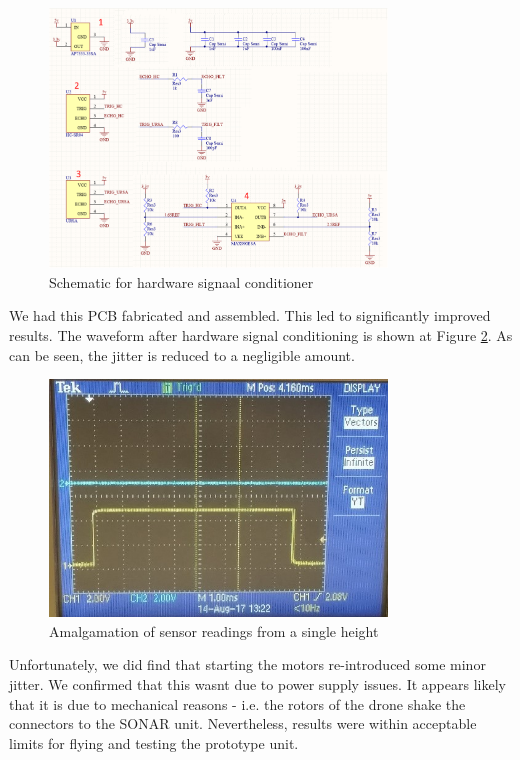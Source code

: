 \documentclass[capstone_report.tex]{subfiles}
\begin{document}
    \begin{figure}[H]
        \centering
        \includegraphics[width=0.8\textwidth]{imgs/schematic.png}
        \caption{Schematic for hardware signaal conditioner\label{fig:sigSchem}}
    \end{figure}

We had this PCB fabricated and assembled. This led to significantly improved results. The waveform after hardware signal conditioning is shown at Figure \ref{fig:goodSig}. As can be seen, the jitter is reduced to a negligible amount.

    \begin{figure}[H]
        \centering
        \includegraphics[width=0.8\textwidth]{imgs/pulseOk.jpg}
        \caption{Amalgamation of sensor readings from a single height\label{fig:goodSig}}
    \end{figure}

Unfortunately, we did find that starting the motors re-introduced some minor jitter. We confirmed that this wasnt due to power supply issues. It appears likely that it is due to mechanical reasons - i.e. the rotors of the drone shake the connectors to the SONAR unit. Nevertheless, results were within acceptable limits for flying and testing the prototype unit.
\end{document}
